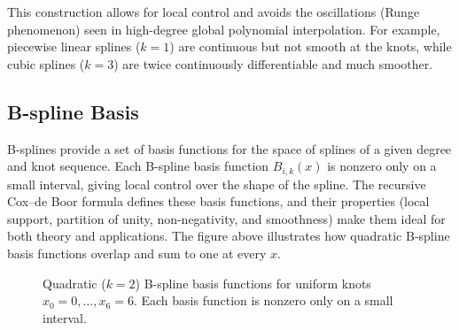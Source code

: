 This construction allows for local control and avoids the oscillations (Runge phenomenon) seen in high-degree global polynomial interpolation. For example, piecewise linear splines (\(k=1\)) are continuous but not smooth at the knots, while cubic splines (\(k=3\)) are twice continuously differentiable and much smoother.

\subsection{B-spline Basis}
B-splines provide a set of basis functions for the space of splines of a given degree and knot sequence. Each B-spline basis function \(B_{i,k}(x)\) is nonzero only on a small interval, giving local control over the shape of the spline. The recursive Cox--de Boor formula defines these basis functions, and their properties (local support, partition of unity, non-negativity, and smoothness) make them ideal for both theory and applications. The figure above illustrates how quadratic B-spline basis functions overlap and sum to one at every \(x\).

\begin{figure}[H]
    \centering
    \caption{Quadratic (\(k=2\)) B-spline basis functions for uniform knots \(x_0=0,\ldots,x_6=6\). Each basis function is nonzero only on a small interval.}
\end{figure}


